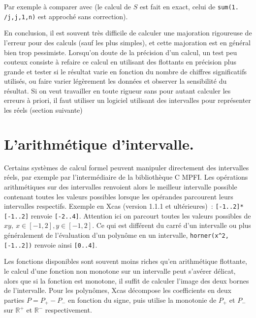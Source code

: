 \documentclass[a4paper,11pt]{book}
\begin{document}
\begin{giacjshere}
Par exemple
\`a comparer avec
(le calcul de $S$ est fait en exact, celui de {\tt sum(1. /j,j,1,n)}
est approch\'e sans correction).

En conclusion, il est souvent tr\`es difficile de calculer une majoration
rigoureuse de l'erreur pour des calculs (sauf les plus simples), et cette
majoration est en g\'en\'eral bien trop pessimiste.
Lorsqu'on doute de la précision d'un calcul, un test peu couteux consiste
à refaire ce calcul en utilisant des flottants en précision plus
grande et tester si le résultat varie en fonction du nombre de chiffres
significatifs utilisés, ou faire varier l\'eg\`erement
les donn\'ees et observer la sensibilit\'e du r\'esultat.
Si on veut travailler en toute rigueur sans
pour autant calculer les erreurs à priori, il faut utiliser un logiciel
utilisant des intervalles pour représenter les réels (section suivante)


\section{L'arithm\'etique d'intervalle.}

Certains syst\`emes de calcul formel peuvent manipuler directement
des intervalles r\'eels, par exemple par l'interm\'ediaire de la
bibliothèque C MPFI. Les op\'erations arithm\'etiques sur des
intervalles renvoient alors le meilleur intervalle possible contenant
toutes les valeurs possibles lorsque les op\'erandes parcourent
leurs intervalles respectifs.
Exemple en Xcas (version 1.1.1 et ult\'erieures)~:
\verb|[-1..2]*[-1..2]| renvoie \verb|[-2..4]|.
Attention ici on parcourt toutes les valeurs possibles de 
$xy, \ x \in [-1,2], y \in [-1,2]$. Ce qui est diff\'erent du carr\'e
d'un intervalle ou plus g\'en\'eralement de l'\'evaluation
d'un polyn\^ome en un intervalle, \verb|horner(x^2,[-1..2])|
renvoie ainsi \verb|[0..4]|.

Les fonctions disponibles sont souvent moins riches qu'en
arithm\'etique flottante, le calcul d'une fonction non monotone
sur un intervalle peut s'av\'erer d\'elicat, alors que si la fonction
est monotone, il suffit de calculer l'image des deux bornes
de l'intervalle. Pour les polyn\^omes, Xcas d\'ecompose
les coefficients en deux parties $P=P_+-P_-$ en fonction
du signe, puis utilise la monotonie de $P_+$ et $P_-$ sur
$\mathbb{R}^+$ et $\mathbb{R}^-$ respectivement.


\end{giacjshere}
\end{document}
